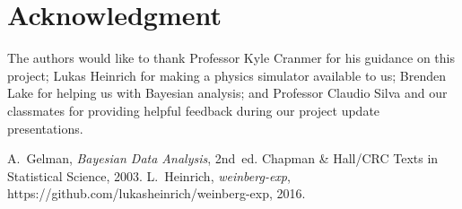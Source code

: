 \documentclass[10pt,journal,compsoc]{IEEEtran}
\begin{document}
  \section*{Acknowledgment}
\fi
The authors would like to thank Professor Kyle Cranmer for his guidance on this project; Lukas Heinrich for making a physics simulator available to us; Brenden Lake for helping us with Bayesian analysis; and Professor Claudio Silva and our classmates for providing helpful feedback during our project update presentations.


\ifCLASSOPTIONcaptionsoff
  \newpage
\fi





%
%
%
\begin{thebibliography}{1}
 A.~Gelman, \emph{Bayesian Data Analysis}, 2nd~ed. Chapman \& Hall/CRC Texts in Statistical Science, 2003.
 L.~Heinrich, \emph{weinberg-exp}, https://github.com/lukasheinrich/weinberg-exp, 2016.
\end{thebibliography}

% 
\end{document}
